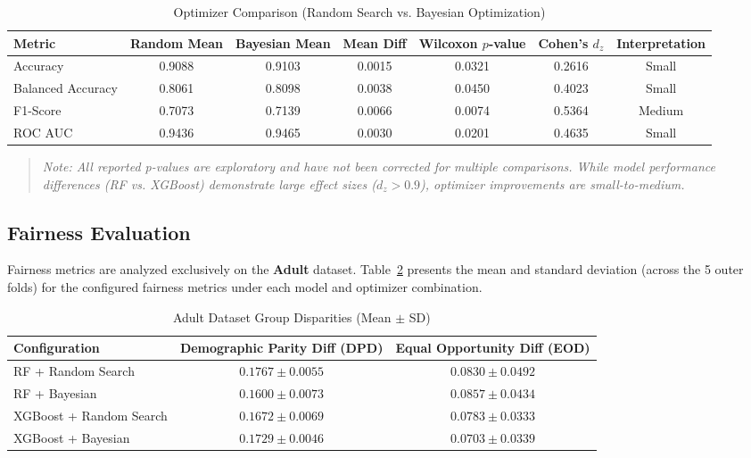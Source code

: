 \documentclass[11pt,a4paper]{article}
\begin{document}
\begin{table}[htbp]
\centering
\caption{Optimizer Comparison (Random Search vs. Bayesian Optimization)}
\label{tab:opt_comparison}
\begin{tabular}{lcccccc}
\toprule
\textbf{Metric} & \textbf{Random Mean} & \textbf{Bayesian Mean} & \textbf{Mean Diff} & \textbf{Wilcoxon $p$-value} & \textbf{Cohen's $d_z$} & \textbf{Interpretation} \\
\midrule
Accuracy          & 0.9088 & 0.9103 & 0.0015 & 0.0321 & 0.2616 & Small \\
Balanced Accuracy & 0.8061 & 0.8098 & 0.0038 & 0.0450 & 0.4023 & Small \\
F1-Score          & 0.7073 & 0.7139 & 0.0066 & 0.0074 & 0.5364 & Medium \\
ROC AUC           & 0.9436 & 0.9465 & 0.0030 & 0.0201 & 0.4635 & Small \\
\bottomrule
\end{tabular}
\end{table}

\begin{quote}
\small\noindent\textit{Note: All reported p-values are exploratory and have not been corrected for multiple comparisons. While model performance differences (RF vs. XGBoost) demonstrate large effect sizes ($d_z > 0.9$), optimizer improvements are small-to-medium.}
\end{quote}

\subsection{Fairness Evaluation}
Fairness metrics are analyzed exclusively on the \textbf{Adult} dataset. Table~\ref{tab:fairness} presents the mean and standard deviation (across the 5 outer folds) for the configured fairness metrics under each model and optimizer combination.

\begin{table}[htbp]
\centering
\caption{Adult Dataset Group Disparities (Mean $\pm$ SD)}
\label{tab:fairness}
\begin{tabular}{lcc}
\toprule
\textbf{Configuration} & \textbf{Demographic Parity Diff (DPD)} & \textbf{Equal Opportunity Diff (EOD)} \\
\midrule
RF + Random Search       & $0.1767 \pm 0.0055$ & $0.0830 \pm 0.0492$ \\
RF + Bayesian            & $0.1600 \pm 0.0073$ & $0.0857 \pm 0.0434$ \\
XGBoost + Random Search  & $0.1672 \pm 0.0069$ & $0.0783 \pm 0.0333$ \\
XGBoost + Bayesian       & $0.1729 \pm 0.0046$ & $0.0703 \pm 0.0339$ \\
\bottomrule
\end{tabular}
\end{table}
\end{document}
